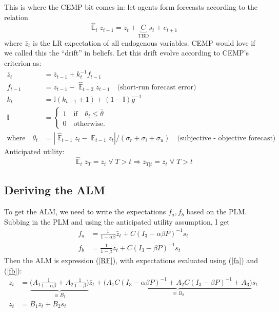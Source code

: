 \documentclass[11pt]{article}
\renewcommand{\[}{\begin{equation}}
\renewcommand{\]}{\end{equation}}
\DeclareMathOperator{\E}{\mathbb{E}}
\begin{document}
This is where the CEMP bit comes in: let agents form forecasts according to the relation
\begin{equation}
\hat{\E}_t z_{t+1} = \bar{z}_t + \underbrace{C}_{\text{TBD}}s_{t} + e_{t+1} \tag{PLM}
\end{equation}
where $\bar{z}_t$ is the LR expectation of all endogenous variables. CEMP would love if we called this the ``drift'' in beliefs. Let this drift evolve according to CEMP's criterion as:
\begin{align}
\bar{z}_t & = \bar{z}_{t-1} + k_t^{-1} f_{t-1}  \\
f_{t-1} & = z_{t-1} - \hat{\E}_{t-2}z_{t-1} \quad \text{(short-run forecast error)} \\
k_t & = \mathbb{I}(k_{t-1}+1) + (1-\mathbb{I})\bar{g}^{-1} \\
\mathbb{I} &= \begin{cases} 1 \quad \text{if} \quad \theta_t \leq \bar{\theta} \\
0 \quad \text{otherwise.}
\end{cases} \\
\text{where} \quad \theta_t & = |\hat{\E}_{t-1}z_t - \E_{t-1}z_t  | / (\sigma_r + \sigma_i + \sigma_u) \quad \text{(subjective - objective forecast)}
\end{align}
Anticipated utility: 
\begin{equation}
\hat{\E}_t \bar{z}_T = \bar{z}_t \; \forall \; T > t \Rightarrow \bar{z}_{T|t} = \bar{z}_t \; \forall \; T > t
\end{equation}


\subsection{Deriving the ALM}
To get the ALM, we need to write the expectations $f_a, f_b$ based on the PLM. Subbing in the PLM and using the anticipated utility assumption, I get
\begin{align}
f_a & = \frac{1}{1-\alpha\beta}\bar{z}_t + C(I_3-\alpha\beta P)^{-1}s_t \label{fa}\\
f_b & = \frac{1}{1-\beta}\bar{z}_t + C(I_3-\beta P)^{-1}s_t \label{fb}
\end{align}
Then the ALM is expression (\ref{RF}), with expectations evaluated using (\ref{fa}) and (\ref{fb}):
\begin{align}
z_t &= \underbrace{\bigg(A_1\frac{1}{1-\alpha\beta} +A_2\frac{1}{1-\beta}\bigg)}_{\equiv B_1}\bar{z}_t + \underbrace{\bigg(A_1C(I_3 - \alpha\beta P)^{-1} +A_2C(I_3 - \beta P)^{-1} +A_3\bigg)}_{\equiv B_2}s_t \tag{ALM} \\
z_t & = B_1 \bar{z}_t + B_2 s_t \label{ALM }
\end{align}
\end{document}
